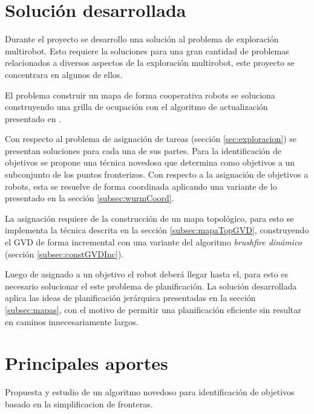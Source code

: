 \section{Solución desarrollada}
Durante el proyecto se desarrollo una solución al problema de exploración
multirobot. Esto requiere la soluciones para una gran cantidad de problemas
relacionados a diversos aspectos de la exploración multirobot, este proyecto se
concentrara en algunos de ellos.

El problema construir un mapa de forma cooperativa robots se soluciona construyendo una grilla de ocupación con
el algoritmo de actualización presentado en \cite{stachniss2009robotic}.


Con respecto al problema de asignación de tareas (sección
\ref{sec:exploracion}) se presentan soluciones para cada una de sus partes.
Para la identificación de objetivos se propone una técnica novedosa que
determina  como
objetivos a un subconjunto de los puntos fronterizos. Con respecto a la
asignación de objetivos a robots, esta se resuelve de forma coordinada
aplicando una variante de lo presentado en la sección \ref{subsec:wurmCoord}.

La asignación requiere de la construcción de un mapa topológico, para esto se
implementa la técnica descrita en la sección \ref{subsec:mapaTopGVD},
construyendo el GVD de forma incremental con una variante del algoritmo
\emph{brushfire dinámico} (sección \ref{subsec:constGVDInc}).

Luego de asignado a un objetivo el robot deberá llegar hasta el, para esto es
necesario solucionar el este problema de planificación. La solución desarrollada 
aplica las ideas de planificación jerárquica presentadas en la sección
\ref{subsec:mapas}, con el motivo de permitir una planificación eficiente sin
resultar en caminos innecesariamente largos.


\section{Principales aportes}

Propuesta y estudio de un algoritmo novedoso para identificación de objetivos basado en la simplificacion de fronteras.%

